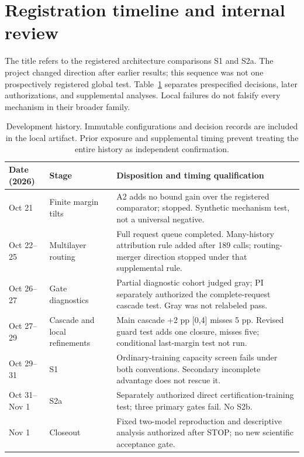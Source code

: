 \section{Registration timeline and internal review}
\label{app:timeline}
The title refers to the registered architecture comparisons S1 and S2a.
The project changed direction after earlier results; this sequence was not
one prospectively registered global test. Table~\ref{tab:timeline} separates
prespecified decisions, later authorizations, and supplemental analyses.
Local failures do not falsify every mechanism in their broader family.

\begin{table}[ht]
\centering\small
\begin{tabular}{p{.12\linewidth}p{.24\linewidth}p{.53\linewidth}}
\toprule
Date (2026)&Stage&Disposition and timing qualification\\
\midrule
Oct 21&Finite margin tilts&A2 adds no bound gain over the registered comparator; stopped. Synthetic mechanism test, not a universal negative.\\
Oct 22--25&Multilayer routing&Full request queue completed. Many-history attribution rule added after 189 calls; routing-merger direction stopped under that supplemental rule.\\
Oct 26--27&Gate diagnostics&Partial diagnostic cohort judged gray; PI separately authorized the complete-request cascade test. Gray was not relabeled pass.\\
Oct 27--29&Cascade and local refinements&Main cascade +2 pp [0,4] misses 5 pp. Revised guard test adds one closure, misses five; conditional last-margin test not run.\\
Oct 29--31&S1&Ordinary-training capacity screen fails under both conventions. Secondary incomplete advantage does not rescue it.\\
Oct 31--Nov 1&S2a&Separately authorized direct certification-training test; three primary gates fail. No S2b.\\
Nov 1&Closeout&Fixed two-model reproduction and descriptive analysis authorized after STOP; no new scientific acceptance gate.\\
\bottomrule
\end{tabular}
\caption{Development history. Immutable configurations and decision records
are included in the local artifact. Prior exposure and supplemental timing
prevent treating the entire history as independent confirmation.}
\label{tab:timeline}
\end{table}

